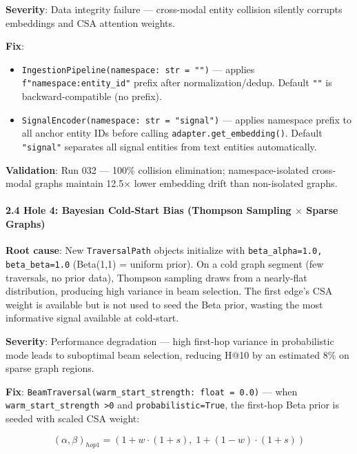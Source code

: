 \textbf{Severity}: Data integrity failure — cross-modal entity collision silently corrupts embeddings and CSA attention weights.

\textbf{Fix}:
\begin{itemize}
\item \texttt{IngestionPipeline(namespace: str = "")} — applies \texttt{f"{namespace}:{entity\_id}"} prefix after norma\-lization/dedup. Default \texttt{""} is backward-compatible (no prefix).
\item \texttt{SignalEncoder(namespace: str = "signal")} — applies namespace prefix to all anchor entity IDs before calling \texttt{adapter.get\_embedding()}. Default \texttt{"signal"} separates all signal entities from text entities autom\-atically.

\end{itemize}
\textbf{Validation}: Run 032 — 100\% collision elimination; namespace-isolated cross-modal graphs maintain 12.5$\times$ lower embedding drift than non-isolated graphs.

\paragraph{2.4 Hole 4: Bayesian Cold-Start Bias (Thompson Sampling $\times$ Sparse Graphs)}

\textbf{Root cause}: New \texttt{TraversalPath} objects initialize with \texttt{beta\_alpha=1.0, beta\_beta=1.0} (Beta(1,1) = uniform prior). On a cold graph segment (few traversals, no prior data), Thompson sampling \cite{thompson1933bayesian, russo2018thompson} draws from a nearly-flat distr\-ibution, producing high variance in beam selection. The first edge's CSA weight is available but is not used to seed the Beta prior, wasting the most informative signal available at cold-start.

\textbf{Severity}: Performance degradation — high first-hop variance in proba\-bilistic mode leads to suboptimal beam selection, reducing H@10 by an estimated 8\% on sparse graph regions.

\textbf{Fix}: \texttt{BeamTraversal(warm\_start\_strength: float = 0.0)} — when \texttt{warm\_start\_strength \textgreater  0} and \texttt{probabilistic=True}, the first-hop Beta prior is seeded with scaled CSA weight:

\begin{equation}
(\alpha, \beta)_{hop1} = (1 + w \cdot (1 + s), \; 1 + (1-w) \cdot (1 + s))
\end{equation}

